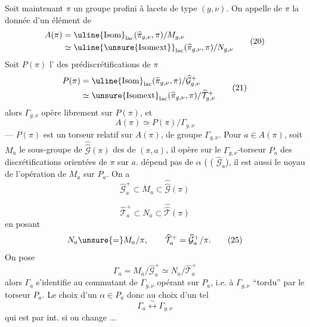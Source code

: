 Soit maintenant $\pi$ un groupe profini à lacets de type $(g,\nu)$. On appelle \uline{} de $\pi$ la donnée d'un élément de
\[
\begin{aligned}
 A(\pi)&=\uline{\mathrm{Isom}}_{\mathrm{lac}}(\widehat{\pi}_{g,\nu},\pi)/M_{g,\nu}\\
 &\simeq\uline{\unsure{\mathrm{Isomext}}}_{\mathrm{lac}}(\widehat{\pi}_{g,\nu},\pi)/N_{g,\nu}
\end{aligned}
\tag{20}
\]
Soit $P(\pi)$ l' des prédiscrétifications  de $\pi$
\[
\begin{aligned}
 P(\pi)&=\uline{\mathrm{Isom}}_{\mathrm{lac}}(\widehat{\pi}_{g,\nu},\pi)/\widehat{\mathcal G}_{g,\nu}^{+}\\
 &\simeq\unsure{\mathrm{Isomext}}_{\mathrm{lac}}(\widehat{\pi}_{g,\nu},\pi)/\widehat{\mathcal T}_{g,\nu}^{+}
\end{aligned}
\tag{21}
\]
alors $\Gamma_{g,\nu}$ opère librement  sur $P(\pi)$, et
\[
 A(\pi)\simeq P(\pi)/\Gamma_{g,\nu}
\tag{22}
\]
--- $P(\pi)$ est un torseur relatif sur $A(\pi)$, de groupe $\Gamma_{g,\nu}$. Pour $a\in A(\pi)$, soit $M_a$ le sous-groupe de $\widehat{\widehat{\mathcal G}}(\pi)$ des  de $(\pi,a)$, il opère sur le $\Gamma_{g,\nu}$-torseur $P_a$ des discrétifications orientées de $\pi$ sur $a$.
 dépend pas de $\alpha$ ( ( $\widehat{\mathcal G}_a$), il est aussi le noyau de l'opération de $M_a$ sur $P_a$. On a
\[
 \widehat{\mathcal G}_a^{+}\subset M_a\subset\widehat{\widehat{\mathcal G}}(\pi)
\tag{23}
\]


\[
 \widehat{\mathcal T}_a^{+}\subset N_a\subset\widehat{\widehat{\mathcal T}}(\pi)
\tag{24}
\]
en posant
\[
 N_a\unsure{=}M_a/\pi,\qquad
 \widehat{\mathcal T}_a^{+}=\widehat{\mathcal G}_a^{+}/\pi.
\tag{25}
\]
On pose
\[
 \Gamma_a=M_a/\widehat{\mathcal G}_a^{+}\simeq N_a/\widehat{\mathcal T}_a^{+}
\tag{26}
\]
alors $\Gamma_a$ s'identifie au commutant de $\Gamma_{g,\nu}$ opérant sur $P_a$, i.e. à $\Gamma_{g,\nu}$ ``tordu'' par le torseur $P_a$. Le choix d'un $\alpha\in P_a$  donc au choix d'un tel 
\[
 \Gamma_a\overset{\sim}{\longleftrightarrow}\Gamma_{g,\nu}
\tag{27}
\]
qui est  par  int. si on change ...

